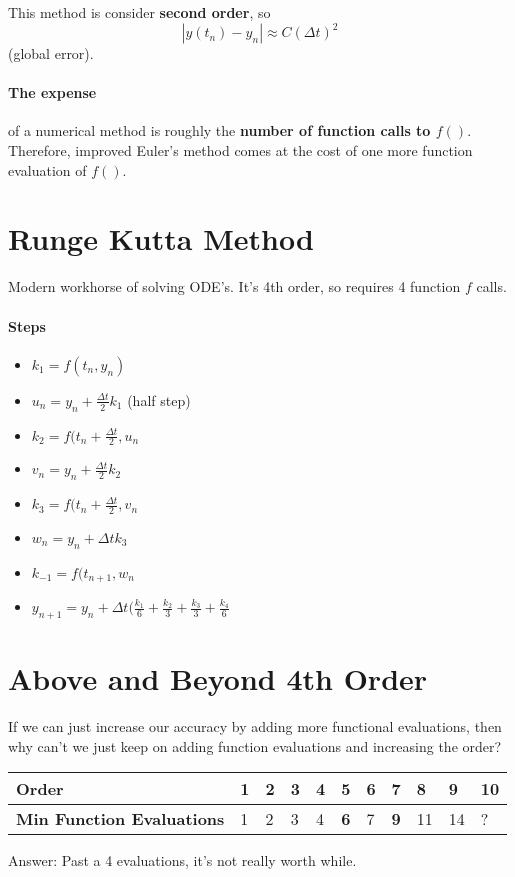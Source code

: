 \documentclass[a4paper,12pt]{report}
\begin{document}
This method is consider \textbf{second order}, so $$|y(t_n)-y_n| \approx C(\Delta t)^2$$ (global error). 

\paragraph{The expense } of a numerical method is roughly the \textbf{number of function calls to $f()$}. 
Therefore, improved Euler's method comes at the cost of one more function evaluation of $f()$. 

\section{Runge Kutta Method}
Modern workhorse of solving ODE's. It's 4th order, so requires 4 function $f$ calls.

\paragraph{Steps}
\begin{itemize}
\item $k_1 = f(t_n, y_n)$
\item $u_n = y_n + \frac{\Delta t}{2} k_1$ (half step)
\item $k_2 = f(t_n + \frac{\Delta t}{2}, u_n$
\item $v_n = y_n + \frac{\Delta t}{2} k_2$
\item $k_3 = f(t_n+\frac{\Delta t}{2}, v_n$
\item $w_n = y_n + \Delta t k_3$
\item $k_{-1} = f(t_{n+1}, w_n$
\item $y_{n+1} = y_n + \Delta t(\frac{k_1}{6}+\frac{k_2}{3}+\frac{k_3}{3}+\frac{k_4}{6}$
\end{itemize}

\section{Above and Beyond 4th Order}
If we can just increase our accuracy by adding more functional evaluations, then why can't we just keep on 
adding function evaluations and increasing the order?

\begin{tabular}{l|llllllllll}
\textbf{Order} & 1 & 2 & 3 & 4 & 5 & 6 & 7 & 8 & 9 & 10 \\
\hline
\textbf{Min Function Evaluations} & 1 & 2 & 3 & 4 & \textbf{6} & 7 & \textbf{9} & 11 & 14 & ? \\
\end{tabular}

Answer: Past a 4 evaluations, it's not really worth while.
\end{document}
